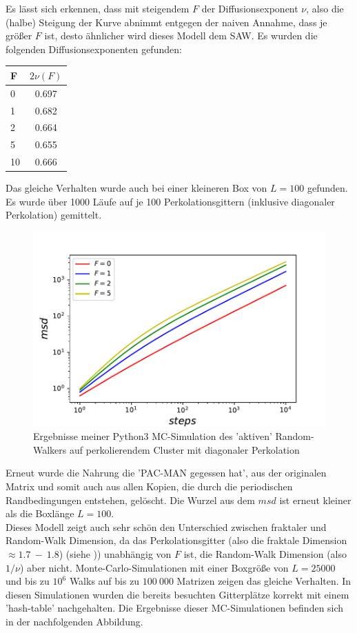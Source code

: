 \documentclass[a4paper, 12pt]{report}
\begin{document}
\noindent Es lässt sich erkennen, dass mit steigendem $F$ der Diffusionsexponent $\nu$, also die (halbe) Steigung der Kurve abnimmt entgegen der naiven Annahme, dass je größer $F$ ist, desto ähnlicher wird dieses Modell dem SAW.
Es wurden die folgenden Diffusionsexponenten gefunden:

\begin{tabular}[h]{l|c}
	F & $2\nu(F)$\\
	\hline
	0 & 0.697\\
	1 & 0.682\\
	2 & 0.664\\
	5 & 0.655\\
	10 & 0.666\\
\end{tabular}

\noindent Das gleiche Verhalten wurde auch bei einer kleineren Box von $L=100$ gefunden. Es wurde über 1000 Läufe auf je 100 Perkolationsgittern (inklusive diagonaler Perkolation) gemittelt.
\begin{figure}[h!]
	\centering
	\includegraphics[scale=0.9]{newfood.pdf}
	\caption{Ergebnisse meiner Python3 MC-Simulation des 'aktiven' Random-Walkers auf perkolierendem Cluster mit diagonaler Perkolation}
\end{figure}
\newpage 
\noindent Erneut wurde die Nahrung die 'PAC-MAN gegessen hat', aus der originalen Matrix und somit auch aus allen Kopien, die durch die periodischen Randbedingungen entstehen, gelöscht. Die Wurzel aus dem $msd$ ist erneut kleiner als die Boxlänge $L=100$.\\
\noindent Dieses Modell zeigt auch sehr schön den Unterschied zwischen fraktaler und Random-Walk Dimension, da das Perkolationsgitter (also die fraktale Dimension $\approx 1.7\ -\ 1.8$) (siehe )\cite{Voss_1984}) unabhängig von $F$ ist, die Random-Walk Dimension (also $1/\nu$) aber nicht.
\newpage
\noindent Monte-Carlo-Simulationen mit einer Boxgröße von $L=25000$ und bis zu $10^6$ Walks auf bis zu $100\ 000$ Matrizen zeigen das gleiche Verhalten. In diesen Simulationen\cite{doi:10.1063/1.4999485} wurden die bereits besuchten Gitterplätze korrekt mit einem 'hash-table' nachgehalten. Die Ergebnisse dieser MC-Simulationen befinden sich in der nachfolgenden Abbildung.
\end{document}
